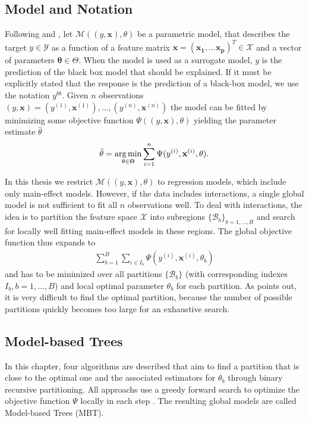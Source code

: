 \subsection{Model and Notation}
Following \citep{Zeileis.2008} and \citep{Seibold.2016}, let $\mathcal{M}((y, \mathbf{x}), \theta)$ be a parametric model, that describes the target $y \in \mathcal{Y}$ as a function of a feature matrix $\mathbf{x} = (\mathbf{x_1}, ... \mathbf{x_p})^T \in \mathcal{X}$  and a vector of parameters $\mathbf{\theta} \in \Theta$. When the model is used as a surrogate model, $y$ is the prediction of the black box model that should be explained.  If it must be explicitly stated that the response is the prediction of a black-box model, we use the notation $y^{bb}$. Given $n$ observations $(y, \mathbf{x}) = (y^{(1)}, \mathbf{x}^{(1)}),..., (y^{(n)}, \mathbf{x}^{(n)})$ the model can be fitted by minimizing some objective function $\Psi((y, \mathbf{x}), \theta)$ yielding the parameter estimate $\hat{\theta}$
\begin{align}
    \hat{\mathbf{\theta}} = \operatorname*{arg\,min}_{\theta \in \Theta} \sum_{i=1}^{n}\Psi(y^{(i)}, \mathbf{x}^{(i)}, \theta).
\end{align}

In this thesis we restrict $\mathcal{M}((y, \mathbf{x}), \theta)$ to regression models, which include only main-effect models. However, if the data includes interactions, a single global model is not sufficient to fit all $n$ observations well.  To deal with interactions, the idea is to partition the feature space $\mathcal{X}$ into subregions $\{\mathcal{B}_b\}_{b = 1,...,B}$ and search for locally well fitting main-effect models in these regions. The global objective function thus expands to
\begin{align}
    \sum_{b=1}^B\sum_{i \in I_b}\Psi(y^{(i)}, \mathbf{x}^{(i)}, \theta_b)
\end{align}
and has to be minimized over all partitions $\{\mathcal{B}_b\}$ (with corresponding indexes $I_b, b = 1,...,B$) and local optimal parameter $\theta_b$ for each partition. As \citep{Zeileis.2008} points out, it is very difficult to find the optimal partition, because the number of possible partitions quickly becomes too large for an exhaustive search.





\subsection{Model-based Trees}
In this chapter, four algorithms are described that aim to find a partition that is close to the optimal one and the associated estimators for $\theta_b$ through binary recursive partitioning. All approachs use a greedy forward search to optimize the objective function $\Psi$ locally in each step \citep{Zeileis.2008}.  
The resulting global models are called Model-based Trees (MBT).



